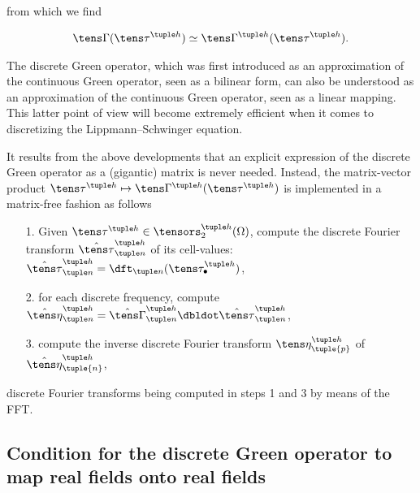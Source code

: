 \documentclass[oneside]{memoir}
\begin{document}
from which we find



\begin{equation*}
\begin{split}\tens\Gamma(\tens\tau^{\tuple h})\simeq\tens\Gamma^{\tuple h}
(\tens\tau^{\tuple h}).\end{split}\end{equation*}


The discrete Green operator, which was first introduced as an approximation of the continuous Green operator, seen as a bilinear form, can also be understood as an approximation of the continuous Green operator, seen as a linear mapping. This latter point of view will become extremely efficient when it comes to discretizing the Lippmann–Schwinger equation.



It results from the above developments that an explicit expression of the discrete Green operator as a (gigantic) matrix is never needed. Instead, the matrix-vector product \(\tens\tau^{\tuple h}\mapsto\tens\Gamma^{\tuple h}(\tens\tau^{\tuple h})\) is implemented in a matrix-free fashion as follows



\begin{itemize}
\item[1. ] Given \(\tens\tau^{\tuple h}\in\tensors_2^{\tuple h}(\Omega)\), compute the discrete Fourier transform \(\hat{\tens\tau}_{\tuple n}^{\tuple h}\) of its cell-values:\(\hat{\tens\tau}_{\tuple n}^{\tuple h}=\dft_{\tuple n}(\tens\tau_\bullet^{\tuple h})\),


\item[2. ] for each discrete frequency, compute \(\hat{\tens\eta}_{\tuple n}^{\tuple h}=\hat{\tens\Gamma}_{\tuple n}^{\tuple h}\dbldot\hat{\tens\tau}_{\tuple n}^{\tuple h}\),


\item[3. ] compute the inverse discrete Fourier transform \(\tens\eta_{\tuple{p}}^{\tuple h}\) of \(\hat{\tens\eta}_{\tuple{n}}^{\tuple h}\),

\end{itemize}


discrete Fourier transforms being computed in steps 1 and 3 by means of the FFT.



\hypertarget{8407349361351071864}{}


\subsection{Condition for the discrete Green operator to map real fields onto real fields}
\end{document}
